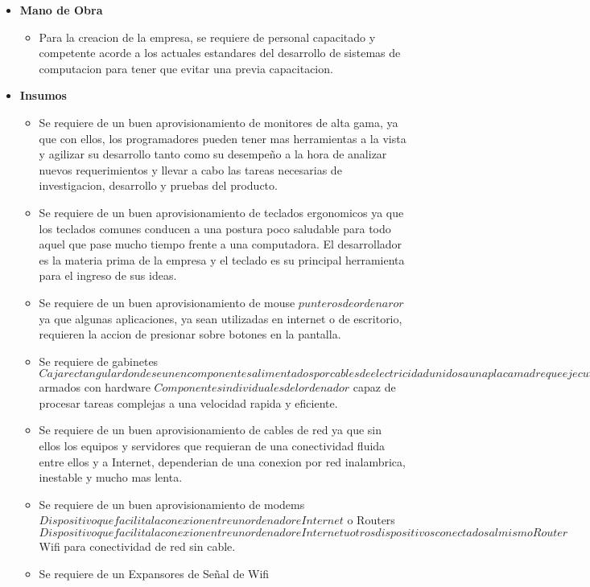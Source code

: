 \documentclass[
10pt, %
a4paper, %
oneside, %
headinclude,footinclude, %
BCOR5mm, %
]{scrartcl}
\begin{document}
\begin{itemize}
  \item \textbf {Mano de Obra}
  \begin{itemize}
    \item Para la creacion de la empresa, se requiere de personal capacitado y
            competente acorde a los actuales estandares del desarrollo de sistemas
            de computacion para tener que evitar una previa capacitacion.
  \end{itemize}

  \item \textbf {Insumos}
  \begin{itemize}
    \item Se requiere de un buen aprovisionamiento de monitores de alta gama,
            ya que con ellos, los programadores pueden tener mas herramientas
            a la vista y agilizar su desarrollo tanto como su desempeño a la
            hora de analizar nuevos requerimientos y llevar a cabo las tareas
            necesarias de investigacion, desarrollo y pruebas del producto.
    \item Se requiere de un buen aprovisionamiento de teclados ergonomicos
            ya que los teclados comunes conducen a una postura poco saludable
            para todo aquel que pase mucho tiempo frente a una computadora.
            El desarrollador es la materia prima de la empresa y el teclado
            es su principal herramienta para el ingreso de sus ideas.
    \item Se requiere de un buen aprovisionamiento de mouse \(punteros de ordenaror\)
            ya que algunas aplicaciones, ya sean utilizadas en internet o de
            escritorio, requieren la accion de presionar sobre botones en la
            pantalla.
      \item Se requiere de gabinetes \(Caja rectangular donde se unen componentes
              alimentados por cables de electricidad unidos a una placa madre
              que ejecutan las tareas internas del ordenador\) armados
              con hardware \(Componentes individuales del ordenador\) capaz
              de procesar tareas complejas a una velocidad rapida y eficiente.
    \item Se requiere de un buen aprovisionamiento de cables de red ya que
            sin ellos los equipos y servidores que requieran de una conectividad
            fluida entre ellos y a Internet, dependerian de una conexion por
            red inalambrica, inestable y mucho mas lenta.
    \item Se requiere de un buen aprovisionamiento de modems \( Dispositivo
            que facilita la conexion entre un ordenador e Internet \) o
            Routers \( Dispositivo que facilita la conexion entre un
            ordenador e Internet u otros dispositivos conectados al mismo
            Router \) Wifi para conectividad de red sin cable.
    \item Se requiere de un Expansores de Señal de Wifi
  \end{itemize}
\end{itemize}
\end{document}
